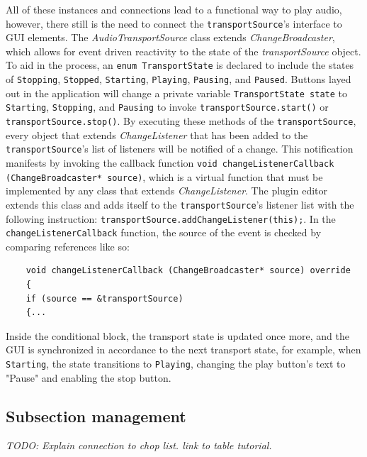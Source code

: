 \documentclass[12pt, a4paper, hidelinks]{article}
\begin{document}
	All of these instances and connections lead to a functional way to play audio, however, there still is the need to connect the \texttt{transportSource}'s interface to GUI elements. The \textit{AudioTransportSource} class extends \textit{ChangeBroadcaster}, which allows for event driven reactivity to the state of the \textit{transportSource} object. To aid in the process, an \texttt{enum TransportState} is declared to include the states of \texttt{Stopping}, \texttt{Stopped}, \texttt{Starting}, \texttt{Playing}, \texttt{Pausing}, and \texttt{Paused}. Buttons layed out in the application will change a private variable \texttt{TransportState state} to \texttt{Starting}, \texttt{Stopping}, and \texttt{Pausing} to invoke \texttt{transportSource.start()} or \texttt{transportSource.stop()}. By executing these methods of the \texttt{transportSource}, every object that extends \textit{ChangeListener} that has been added to the \texttt{transportSource}'s list of listeners will be notified of a change. This notification manifests by invoking the callback function \texttt{void changeListenerCallback (ChangeBroadcaster* source)}, which is a virtual function that must be implemented by any class that extends \textit{ChangeListener}. The plugin editor extends this class and adds itself to the \texttt{transportSource}'s listener list with the following instruction: \texttt{transportSource.addChangeListener(this);}. In the \texttt{changeListenerCallback} function, the source of the event is checked by comparing references like so:
	\begin{verbatim}
	void changeListenerCallback (ChangeBroadcaster* source) override
	{
	if (source == &transportSource)
	{...
	\end{verbatim}
	Inside the conditional block, the transport state is updated once more, and the GUI is synchronized in accordance to the next transport state, for example, when \texttt{Starting}, the state transitions to \texttt{Playing}, changing the play button's text to "Pause" and enabling the stop button. \par
	
	
	
	\newpage
	\subsection{Subsection management}

	\textit{TODO:}
	\textit{Explain connection to chop list. link to table tutorial.}\par
	
\end{document}
